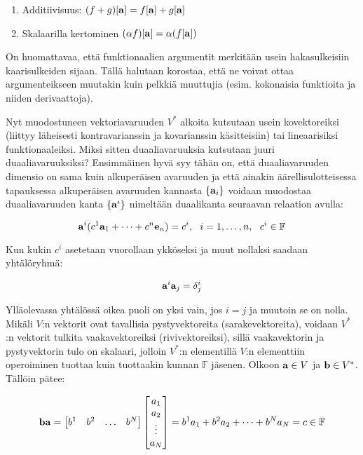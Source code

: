 \documentclass[../johdoksia.tex]{subfiles}
\begin{document}
	\begin{enumerate}
		\item Additiivisuus: $(f + g)[\mathbf{a}] = f[\mathbf{a}] + g[\mathbf{a}]$
		\item Skalaarilla kertominen $(\alpha f)[\mathbf{a}] = \alpha (f[\mathbf{a}])$
	\end{enumerate}

	On huomattavaa, että funktionaalien argumentit merkitään usein hakasulkeisiin kaarisulkeiden sijaan. Tällä halutaan korostaa, että ne voivat ottaa argumenteikseen muutakin kuin pelkkiä muuttujia (esim. kokonaisia funktioita ja niiden derivaattoja).
	
	Nyt muodostuneen vektoriavaruuden $V^\ast$ alkoita kutsutaan usein kovektoreiksi (liittyy läheisesti kontravarianssin ja kovarianssin käsitteisiin) tai lineaarisiksi funktionaaleiksi. Miksi sitten duaaliavaruuksia kutsutaan juuri duaaliavaruuksiksi? Ensimmäinen hyvä syy tähän on, että duaaliavaruuden dimensio on sama kuin alkuperäisen avaruuden ja että ainakin äärellisulotteisessa tapauksessa alkuperäisen avaruuden kannasta $\{\mathbf{a}_i\}$ voidaan muodostaa duaaliavaruuden kanta $\{\mathbf{a}^i\}$ nimeltään duaalikanta seuraavan relaation avulla:
	
	\begin{equation}
		\mathbf{a}^i(c^1\mathbf{a}_1 + \dots + c^n\mathbf{e}_n) = c^i, \ \ i = 1, \dots, n, \ \ c^{i} \in \mathbb{F}
	\end{equation}

	Kun kukin $c^{i}$ asetetaan vuorollaan ykköseksi ja muut nollaksi saadaan yhtälöryhmä:
	
	\begin{equation}
		\mathbf{a}^i\mathbf{a}_j = \delta^i_j
	\end{equation}

	Ylläolevassa yhtälössä oikea puoli on yksi vain, jos $i = j$ ja muutoin se on nolla. Mikäli $V$:n vektorit ovat tavallisia pystyvektoreita (sarakevektoreita), voidaan $V^\ast$:n vektorit tulkita vaakavektoreiksi (rivivektoreiksi), sillä vaakavektorin ja pystyvektorin tulo on skalaari, jolloin $V^\ast$:n elementillä $V$:n elementtiin operoiminen tuottaa kuin tuottaakin kunnan $\mathbb{F}$ jäsenen. Olkoon $\mathbf{a} \in V$ ja $\mathbf{b} \in V^{\ast}$. Tällöin pätee:
	
	\begin{equation}
		\mathbf{b}\mathbf{a} = \begin{bmatrix}
			b^1 & b^2 & \dots & b^N
		\end{bmatrix}\begin{bmatrix}
		a_1 \\
		a_2 \\
		\vdots \\
		a_N
	\end{bmatrix} = b^1a_1 + b^2a_2 + \dots + b^Na_N = c \in \mathbb{F}
	\end{equation}
\end{document}

